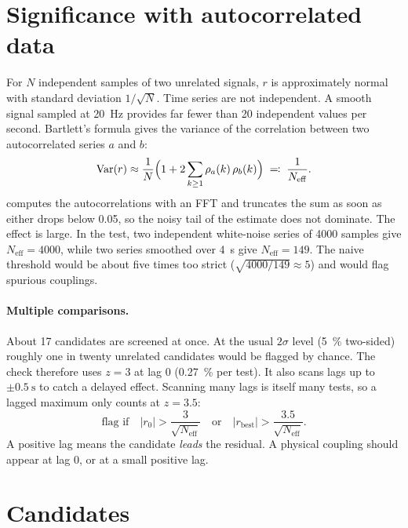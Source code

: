 \section{Significance with autocorrelated data}
\label{sec:neff}

For $N$ independent samples of two unrelated signals, $r$ is approximately normal with
standard deviation $1/\sqrt N$. Time series are not independent. A smooth signal sampled at
\qty{20}{\hertz} provides far fewer than 20 independent values per second. Bartlett's formula
\cite{bartlett1946} gives the variance of the correlation between two autocorrelated series
$a$ and $b$:
\begin{equation}
  \mathrm{Var}(r) \approx \frac{1}{N}\Bigl(1 + 2\sum_{k\ge1}\rho_a(k)\,\rho_b(k)\Bigr)
  \;\eqqcolon\; \frac{1}{N_\mathrm{eff}} .
  \label{eq:neff}
\end{equation}
 computes the autocorrelations with an FFT and truncates the sum as soon as
either drops below \num{0.05}, so the noisy tail of the estimate does not dominate. The
effect is large. In the test, two independent white-noise series of \num{4000} samples give
$N_\mathrm{eff} = \num{4000}$, while two series smoothed over \qty{4}{\second} give
$N_\mathrm{eff} = \num{149}$. The naive threshold would be about five times too strict
($\sqrt{4000/149}\approx5$) and would flag spurious couplings.

\paragraph{Multiple comparisons.} About 17 candidates are screened at once. At the usual
$2\sigma$ level (\qty{5}{\percent} two-sided) roughly one in twenty unrelated candidates would
be flagged by chance. The check therefore uses $z = 3$ at lag 0
(\qty{0.27}{\percent} per test). It also scans lags up to $\pm\qty{0.5}{\second}$ to catch a
delayed effect. Scanning many lags is itself many tests, so a lagged maximum only counts at
$z = 3.5$:
\begin{equation}
  \text{flag if}\quad |r_0| > \frac{3}{\sqrt{N_\mathrm{eff}}}
  \quad\text{or}\quad |r_\mathrm{best}| > \frac{3.5}{\sqrt{N_\mathrm{eff}}} .
\end{equation}
A positive lag means the candidate \emph{leads} the residual. A physical coupling should
appear at lag 0, or at a small positive lag.

\section{Candidates}

